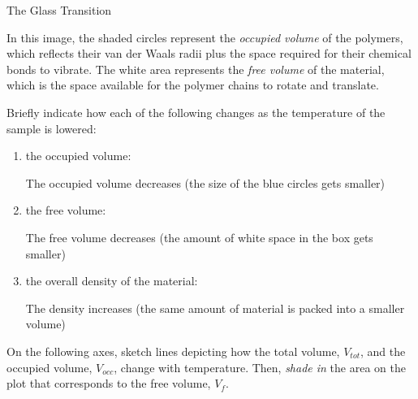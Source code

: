 \begin{activity}{The Glass Transition}
\begin{model}
	In this image, the shaded circles represent the \textit{occupied volume} of the polymers, which reflects their van der Waals radii plus the space required for their chemical bonds to vibrate.  The white area represents the \emph{free volume} of the material, which is the space available for the polymer chains to rotate and translate.
	
\end{model}


\begin{ctqs}

	\question Briefly indicate how each of the following changes as the temperature of the sample is lowered:
	
		\begin{enumerate}
		
			\item the occupied volume:
			
				\begin{solution}[0.25in]
					The occupied volume decreases (the size of the blue circles gets smaller)
				\end{solution}
			
			\item the free volume:
			
				\begin{solution}[0.25in]
					The free volume decreases (the amount of white space in the box gets smaller)
				\end{solution}
			
			\item the overall density of the material:
			
				\begin{solution}[0.25in]
					The density increases (the same amount of material is packed into a smaller volume)
				\end{solution}
			
		\end{enumerate}
		
	\question On the following axes, sketch lines depicting how the total volume, $V_{tot}$, and the occupied volume, $V_{occ}$, change with temperature.  Then, \emph{shade in} the area on the plot that corresponds to the free volume, $V_f$. \label{\labelbase:ctq:VTplot1}
	
		\vspace{0.25in}
		\begin{solution}[1.5in]\end{solution}
		

\end{ctqs}
\end{activity}
